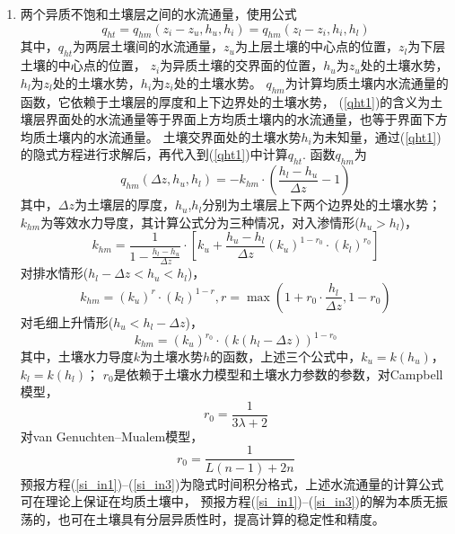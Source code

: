 \begin{enumerate}
    \item 两个异质不饱和土壤层之间的水流通量，使用公式
    \begin{equation}\label{qht1}
        q_{h t}=q_{h m}\left(z_{i}-z_{u}, h_{u}, h_{i}\right)=q_{h m}\left(z_{l}-z_{i}, h_{i}, h_{l}\right)
        \end{equation}
        其中，$q_{ht}$为两层土壤间的水流通量，$z_u$为上层土壤的中心点的位置，$z_l$为下层土壤的中心点的位置，
        $z_i$为异质土壤的交界面的位置，$h_u$为$z_u$处的土壤水势，$h_l$为$z_l$处的土壤水势，$h_i$为$z_i$处的土壤水势。
        $q_{hm}$为计算均质土壤内水流通量的函数，它依赖于土壤层的厚度和上下边界处的土壤水势，
        (\ref{qht1})的含义为土壤层界面处的水流通量等于界面上方均质土壤内的水流通量，也等于界面下方均质土壤内的水流通量。
        土壤交界面处的土壤水势$h_i$为未知量，通过(\ref{qht1})的隐式方程进行求解后，再代入到(\ref{qht1})中计算$q_{ht}$. 函数$q_{hm}$为
        \begin{equation}
        q_{h m}\left(\Delta z, h_{u}, h_{l}\right)=-k_{h m} \cdot\left(\frac{h_{l}-h_{u}}{\Delta z}-1\right)
        \end{equation}
        其中，$\Delta z$为土壤层的厚度，$h_u$,$h_l$分别为土壤层上下两个边界处的土壤水势；
        $k_{hm}$为等效水力导度，其计算公式分为三种情况，对入渗情形($h_u>h_l$)，
        \begin{equation}
        k_{h m}=\frac{1}{1-\frac{h_{l}-h_{u}}{\Delta z}} \cdot\left[k_{u}+\frac{h_{u}-h_{l}}{\Delta z}\left(k_{u}\right)^{1-r_{0}} \cdot\left(k_{l}\right)^{r_{0}}\right]
        \end{equation}
        对排水情形($h_l-\Delta z<h_u<h_l$)，
        \begin{equation}
        k_{h m}=\left(k_{u}\right)^{r} \cdot\left(k_{l}\right)^{1-r}, r=\max \left(1+r_{0} \cdot \frac{h_{l}}{\Delta z}, 1-r_{0}\right)
        \end{equation}
        对毛细上升情形($h_u<h_l-\Delta z$)，
        \begin{equation}
        k_{h m}=\left(k_{u}\right)^{r_{0}} \cdot\left(k\left(h_{l}-\Delta z\right)\right)^{1-r_{0}}
        \end{equation}
        其中，土壤水力导度$k$为土壤水势$h$的函数，上述三个公式中，$k_u=k(h_u )$，$k_l=k(h_l )$；
        $r_0$是依赖于土壤水力模型和土壤水力参数的参数，对Campbell模型，
        \begin{equation}
        r_{0}=\frac{1}{3 \lambda+2}
        \end{equation}
        对van Genuchten--Mualem模型，
        \begin{equation}
        r_{0}=\frac{1}{L(n-1)+2 n}
        \end{equation}
        预报方程(\ref{si_in1})--(\ref{si_in3})为隐式时间积分格式，上述水流通量的计算公式可在理论上保证在均质土壤中，
        预报方程(\ref{si_in1})--(\ref{si_in3})的解为本质无振荡的，也可在土壤具有分层异质性时，提高计算的稳定性和精度。


\end{enumerate}
